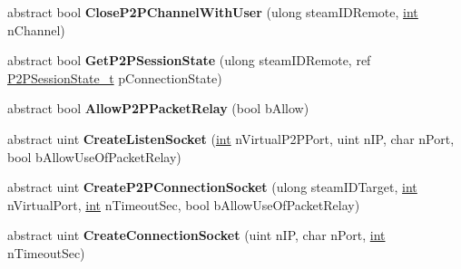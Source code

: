 \begin{DoxyCompactItemize}
\item 
\hypertarget{classValve_1_1Steamworks_1_1ISteamNetworking_a8b782572a8c89ee220008042c6d77a7e}{}abstract bool {\bfseries Close\+P2\+P\+Channel\+With\+User} (ulong steam\+I\+D\+Remote, \hyperlink{SDL__thread_8h_a6a64f9be4433e4de6e2f2f548cf3c08e}{int} n\+Channel)\label{classValve_1_1Steamworks_1_1ISteamNetworking_a8b782572a8c89ee220008042c6d77a7e}

\item 
\hypertarget{classValve_1_1Steamworks_1_1ISteamNetworking_a80398c441c26657f7ac4f0e2173b6c31}{}abstract bool {\bfseries Get\+P2\+P\+Session\+State} (ulong steam\+I\+D\+Remote, ref \hyperlink{structValve_1_1Steamworks_1_1P2PSessionState__t}{P2\+P\+Session\+State\+\_\+t} p\+Connection\+State)\label{classValve_1_1Steamworks_1_1ISteamNetworking_a80398c441c26657f7ac4f0e2173b6c31}

\item 
\hypertarget{classValve_1_1Steamworks_1_1ISteamNetworking_adc1e5d85e029e4a55042f218d963108f}{}abstract bool {\bfseries Allow\+P2\+P\+Packet\+Relay} (bool b\+Allow)\label{classValve_1_1Steamworks_1_1ISteamNetworking_adc1e5d85e029e4a55042f218d963108f}

\item 
\hypertarget{classValve_1_1Steamworks_1_1ISteamNetworking_a0ddc9d2254967d89c9838857de5ad243}{}abstract uint {\bfseries Create\+Listen\+Socket} (\hyperlink{SDL__thread_8h_a6a64f9be4433e4de6e2f2f548cf3c08e}{int} n\+Virtual\+P2\+P\+Port, uint n\+I\+P, char n\+Port, bool b\+Allow\+Use\+Of\+Packet\+Relay)\label{classValve_1_1Steamworks_1_1ISteamNetworking_a0ddc9d2254967d89c9838857de5ad243}

\item 
\hypertarget{classValve_1_1Steamworks_1_1ISteamNetworking_a1cd6430a404879d28e7c0b9c4ca706cd}{}abstract uint {\bfseries Create\+P2\+P\+Connection\+Socket} (ulong steam\+I\+D\+Target, \hyperlink{SDL__thread_8h_a6a64f9be4433e4de6e2f2f548cf3c08e}{int} n\+Virtual\+Port, \hyperlink{SDL__thread_8h_a6a64f9be4433e4de6e2f2f548cf3c08e}{int} n\+Timeout\+Sec, bool b\+Allow\+Use\+Of\+Packet\+Relay)\label{classValve_1_1Steamworks_1_1ISteamNetworking_a1cd6430a404879d28e7c0b9c4ca706cd}

\item 
\hypertarget{classValve_1_1Steamworks_1_1ISteamNetworking_a2eb17da3d3d3d423cdcd20d8bc2b788a}{}abstract uint {\bfseries Create\+Connection\+Socket} (uint n\+I\+P, char n\+Port, \hyperlink{SDL__thread_8h_a6a64f9be4433e4de6e2f2f548cf3c08e}{int} n\+Timeout\+Sec)\label{classValve_1_1Steamworks_1_1ISteamNetworking_a2eb17da3d3d3d423cdcd20d8bc2b788a}


\end{DoxyCompactItemize}
